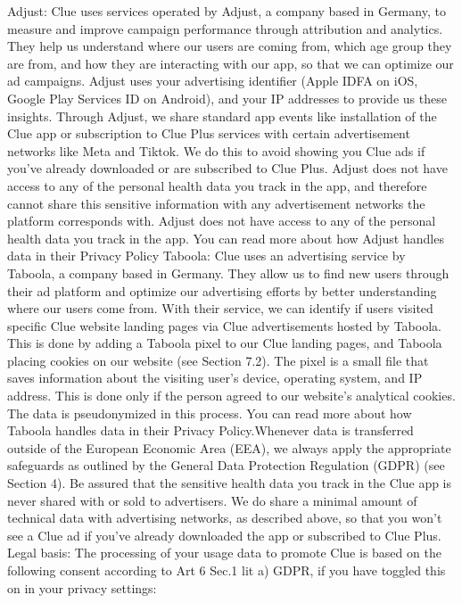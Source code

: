 Adjust: Clue uses services operated by Adjust, a company based in Germany, to measure and improve campaign performance through attribution and analytics. They help us understand where our users are coming from, which age group they are from, and how they are interacting with our app, so that we can optimize our ad campaigns. Adjust uses your advertising identifier (Apple IDFA on iOS, Google Play Services ID on Android), and your IP addresses to provide us these insights. Through Adjust, we share standard app events like installation of the Clue app or subscription to Clue Plus services with certain advertisement networks like Meta and Tiktok. We do this to avoid showing you Clue ads if you’ve already downloaded or are subscribed to Clue Plus. Adjust does not have access to any of the personal health data you track in the app, and therefore cannot share this sensitive information with any advertisement networks the platform corresponds with. Adjust does not have access to any of the personal health data you track in the app. You can read more about how Adjust handles data in their Privacy Policy
Taboola: Clue uses an advertising service by Taboola, a company based in Germany. They allow us to find new users through their ad platform and optimize our advertising efforts by better understanding where our users come from. With their service, we can identify if users visited specific Clue website landing pages via Clue advertisements hosted by Taboola. This is done by adding a Taboola pixel to our Clue landing pages, and Taboola placing cookies on our website (see Section 7.2). The pixel is a small file that saves information about the visiting user’s device, operating system, and IP address. This is done only if the person agreed to our website’s analytical cookies. The data is pseudonymized in this process. You can read more about how Taboola handles data in their Privacy Policy.Whenever data is transferred outside of the European Economic Area (EEA), we always apply the appropriate safeguards as outlined by the General Data Protection Regulation (GDPR) (see Section 4). Be assured that the sensitive health data you track in the Clue app is never shared with or sold to advertisers. We do share a minimal amount of technical data with advertising networks, as described above, so that you won’t see a Clue ad if you’ve already downloaded the app or subscribed to Clue Plus.
Legal basis: The processing of your usage data to promote Clue is based on the following consent according to Art 6 Sec.1 lit a) GDPR, if you have toggled this on in your privacy settings:

